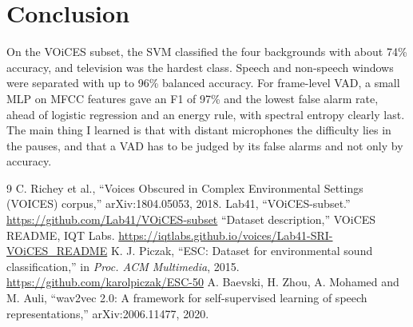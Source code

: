 \documentclass[11pt,a4paper]{article}
\begin{document}
\section{Conclusion}
On the VOiCES subset, the SVM classified the four backgrounds with about 74\% accuracy, and television was the hardest class. Speech and non-speech windows were separated with up to 96\% balanced accuracy. For frame-level VAD, a small MLP on MFCC features gave an F1 of 97\% and the lowest false alarm rate, ahead of logistic regression and an energy rule, with spectral entropy clearly last. The main thing I learned is that with distant microphones the difficulty lies in the pauses, and that a VAD has to be judged by its false alarms and not only by accuracy.

\begingroup\small
\begin{thebibliography}{9}\setlength{\itemsep}{0pt}
 C. Richey et al., ``Voices Obscured in Complex Environmental Settings (VOICES) corpus,'' arXiv:1804.05053, 2018.
 Lab41, ``VOiCES-subset.'' \url{https://github.com/Lab41/VOiCES-subset}
 ``Dataset description,'' VOiCES README, IQT Labs. \url{https://iqtlabs.github.io/voices/Lab41-SRI-VOiCES_README}
 K. J. Piczak, ``ESC: Dataset for environmental sound classification,'' in \emph{Proc. ACM Multimedia}, 2015. \url{https://github.com/karolpiczak/ESC-50}
 A. Baevski, H. Zhou, A. Mohamed and M. Auli, ``wav2vec 2.0: A framework for self-supervised learning of speech representations,'' arXiv:2006.11477, 2020.
\end{thebibliography}
\endgroup
\end{document}
